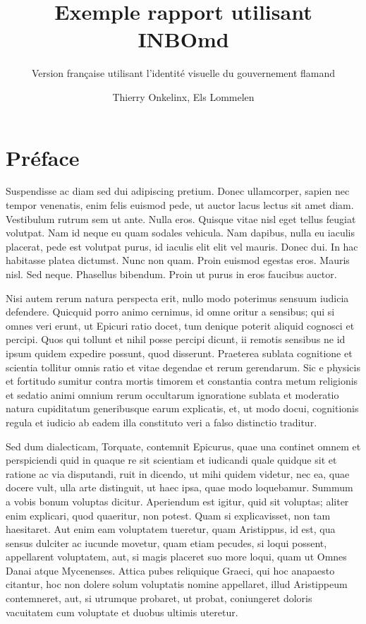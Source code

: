 \documentclass[twoside]{extreport}
\title{Exemple rapport utilisant INBOmd}
\subtitle{Version française utilisant l'identité visuelle du
gouvernement flamand}
\author{
Thierry Onkelinx, Els Lommelen
}
\begin{document}

\maketitle
{}



\hypertarget{pruxe9face}{%
\chapter*{Préface}\label{pruxe9face}}

Suspendisse ac diam sed dui adipiscing pretium. Donec ullamcorper,
sapien nec tempor venenatis, enim felis euismod pede, ut auctor lacus
lectus sit amet diam. Vestibulum rutrum sem ut ante. Nulla eros. Quisque
vitae nisl eget tellus feugiat volutpat. Nam id neque eu quam sodales
vehicula. Nam dapibus, nulla eu iaculis placerat, pede est volutpat
purus, id iaculis elit elit vel mauris. Donec dui. In hac habitasse
platea dictumst. Nunc non quam. Proin euismod egestas eros. Mauris nisl.
Sed neque. Phasellus bibendum. Proin ut purus in eros faucibus auctor.

Nisi autem rerum natura perspecta erit, nullo modo poterimus sensuum
iudicia defendere. Quicquid porro animo cernimus, id omne oritur a
sensibus; qui si omnes veri erunt, ut Epicuri ratio docet, tum denique
poterit aliquid cognosci et percipi. Quos qui tollunt et nihil posse
percipi dicunt, ii remotis sensibus ne id ipsum quidem expedire possunt,
quod disserunt. Praeterea sublata cognitione et scientia tollitur omnis
ratio et vitae degendae et rerum gerendarum. Sic e physicis et fortitudo
sumitur contra mortis timorem et constantia contra metum religionis et
sedatio animi omnium rerum occultarum ignoratione sublata et moderatio
natura cupiditatum generibusque earum explicatis, et, ut modo docui,
cognitionis regula et iudicio ab eadem illa constituto veri a falso
distinctio traditur.

Sed dum dialecticam, Torquate, contemnit Epicurus, quae una continet
omnem et perspiciendi quid in quaque re sit scientiam et iudicandi quale
quidque sit et ratione ac via disputandi, ruit in dicendo, ut mihi
quidem videtur, nec ea, quae docere vult, ulla arte distinguit, ut haec
ipsa, quae modo loquebamur. Summum a vobis bonum voluptas dicitur.
Aperiendum est igitur, quid sit voluptas; aliter enim explicari, quod
quaeritur, non potest. Quam si explicavisset, non tam haesitaret. Aut
enim eam voluptatem tueretur, quam Aristippus, id est, qua sensus
dulciter ac iucunde movetur, quam etiam pecudes, si loqui possent,
appellarent voluptatem, aut, si magis placeret suo more loqui, quam ut
Omnes Danai atque Mycenenses. Attica pubes reliquique Graeci, qui hoc
anapaesto citantur, hoc non dolere solum voluptatis nomine appellaret,
illud Aristippeum contemneret, aut, si utrumque probaret, ut probat,
coniungeret doloris vacuitatem cum voluptate et duobus ultimis uteretur.
\end{document}
